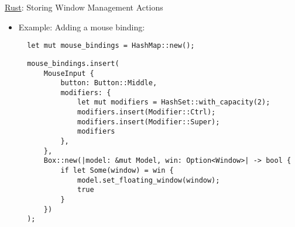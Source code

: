 \begin{frame}[fragile]{\underline{Rust}: Storing Window Management Actions \hfill {\footnotesize \currentname}}


    \begin{itemize}

        \item Example: Adding a mouse binding:\\[3pt] 
\begin{verbatim}
  let mut mouse_bindings = HashMap::new();
\end{verbatim}
\begin{verbatim}
  mouse_bindings.insert(
      MouseInput {
          button: Button::Middle,
          modifiers: {
              let mut modifiers = HashSet::with_capacity(2);
              modifiers.insert(Modifier::Ctrl);
              modifiers.insert(Modifier::Super);
              modifiers
          },
      },
      Box::new(|model: &mut Model, win: Option<Window>| -> bool {
          if let Some(window) = win {
              model.set_floating_window(window);
              true
          }
      })
  );
\end{verbatim}

    \end{itemize}

    \vfill

\end{frame}



